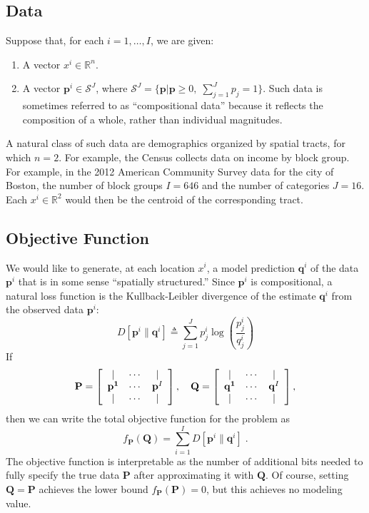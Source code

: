 \documentclass[english]{scrartcl}
\newcommand\R[0]{\mathbb{R}}
\begin{document}
	\subsection{Data}
	Suppose that, for each $i = 1,\ldots,I$, we are given:
	\begin{enumerate}
		\item A vector $x^i\in \R^n$.
		\item A vector $\mathbf{p}^i \in \mathcal{S}^J$, where $\mathcal{S}^J = \{\mathbf{p} | \mathbf{p} \geq 0,\; \sum_{j = 1}^J p_j = 1\}$. Such data is sometimes referred to as ``compositional data'' because it reflects the composition of a whole, rather than individual magnitudes. 
	\end{enumerate}
	A natural class of such data are demographics organized by spatial tracts, for which $n = 2$. For example, the Census collects data on income by block group. For example, in the 2012 American Community Survey data for the city of Boston, the number of block groups $I = 646$ and the number of categories $J = 16$. Each $x^i \in \R^2$ would then be the centroid of the corresponding tract. 

	\subsection{Objective Function}
	We would like to generate, at each location $x^i$, a model prediction $\mathbf{q}^i$ of the data $\mathbf{p}^i$ that is in some sense ``spatially structured.'' Since $\mathbf{p}^i$ is compositional, a natural loss function is the Kullback-Leibler divergence of the estimate $\mathbf{q}^i$ from the observed data $\mathbf{p}^i$: 
	\begin{equation}
		D[\mathbf{p}^i\|\mathbf{q}^i] \triangleq \sum_{j=1}^J p^i_j \log \left(\frac{p^i_j}{q^i_j} \right)
	\end{equation}
	If 
	\begin{equation}
		\mathbf{P} = \left[\begin{array}{c c c}
			| & \cdots & | \\
			\mathbf{p^1} & \cdots & \mathbf{p}^I \\
			| & \cdots & | 
		\end{array}\right],
		\quad 
		\mathbf{Q} = \left[\begin{array}{c c c}
			| & \cdots & | \\
			\mathbf{q^1} & \cdots & \mathbf{q}^I \\
			| & \cdots & | 
		\end{array}\right],
	\end{equation}
	then we can write the total objective function for the problem as 
	\begin{equation}
		f_\mathbf{P}(\mathbf{Q}) = \sum_{i = 1}^I D[\mathbf{p}^i \| \mathbf{q}^i]\;.
	\end{equation}
	The objective function is interpretable as the number of additional bits needed to fully specify the true data $\mathbf{P}$ after approximating it with $\mathbf{Q}$. Of course, setting $\mathbf{Q} = \mathbf{P}$ achieves the lower bound $f_\mathbf{P}(\mathbf{P}) = 0$, but this achieves no modeling value. 
\end{document}
